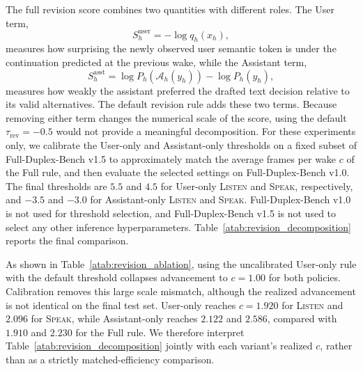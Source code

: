 The full revision score combines two quantities with different roles.
The User term,
\begin{equation}
S_h^{\mathrm{user}}
=
-\log q_h(x_h),
\end{equation}
measures how surprising the newly observed user semantic token is under the continuation predicted at the previous wake, while the Assistant term,
\begin{equation}
S_h^{\mathrm{asst}}
=
\log P_h(\mathcal{A}_h(y_h))
-
\log P_h(y_h),
\end{equation}
measures how weakly the assistant preferred the drafted text decision relative to its valid alternatives.
The default revision rule adds these two terms.
Because removing either term changes the numerical scale of the score, using the default $\tau_{\mathrm{rev}}=-0.5$ would not provide a meaningful decomposition.
For these experiments only, we calibrate the User-only and Assistant-only thresholds on a fixed subset of Full-Duplex-Bench v1.5 to approximately match the average frames per wake $c$ of the Full rule, and then evaluate the selected settings on Full-Duplex-Bench v1.0.
The final thresholds are $5.5$ and $4.5$ for User-only \textsc{Listen} and \textsc{Speak}, respectively, and $-3.5$ and $-3.0$ for Assistant-only \textsc{Listen} and \textsc{Speak}.
Full-Duplex-Bench v1.0 is not used for threshold selection, and Full-Duplex-Bench v1.5 is not used to select any other inference hyperparameters.
Table~\ref{atab:revision_decomposition} reports the final comparison.




As shown in Table~\ref{atab:revision_ablation}, using the uncalibrated User-only rule with the default threshold collapses advancement to $c=1.00$ for both policies.
Calibration removes this large scale mismatch, although the realized advancement is not identical on the final test set.
User-only reaches $c=1.920$ for \textsc{Listen} and $2.096$ for \textsc{Speak}, while Assistant-only reaches $2.122$ and $2.586$, compared with $1.910$ and $2.230$ for the Full rule.
We therefore interpret Table~\ref{atab:revision_decomposition} jointly with each variant's realized $c$, rather than as a strictly matched-efficiency comparison.

